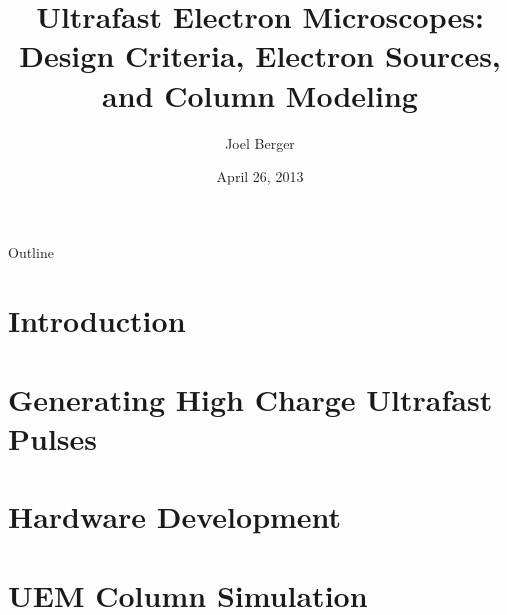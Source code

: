 \documentclass[mathserif]{beamer}
\title[Ultrafast EM]{Ultrafast Electron Microscopes:\\Design Criteria, Electron Sources, and Column Modeling}
\author{Joel Berger}
\institute[UIC]{Ph.D. Preliminary Examination}
\date{April 26, 2013}
\begin{document}
\begin{frame}
  \maketitle
\end{frame}

\begin{frame}{Outline}
  \tableofcontents
\end{frame}



\section{Introduction}




\section{Generating High Charge Ultrafast Pulses}


\section{Hardware Development}


\section{UEM Column Simulation}

\end{document}
